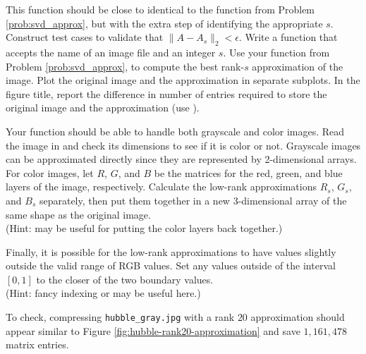 This function should be close to identical to the function from Problem \ref{prob:svd_approx}, but with the extra step of identifying the appropriate $s$.
Construct test cases to validate that $\| A - A_s \|_2 < \epsilon$.
Write a function that accepts the name of an image file and an integer $s$.
Use your function from Problem \ref{prob:svd_approx}, to compute the best rank-$s$ approximation of the image.
Plot the original image and the approximation in separate subplots.
In the figure title, report the difference in number of entries required to store the original image and the approximation (use ).

Your function should be able to handle both grayscale and color images.
Read the image in and check its dimensions to see if it is color or not.
Grayscale images can be approximated directly since they are represented by 2-dimensional arrays.
For color images, let $R$, $G$, and $B$ be the matrices for the red, green, and blue layers of the image, respectively.
Calculate the low-rank approximations $R_s$, $G_s$, and $B_s$ separately, then put them together in a new 3-dimensional array of the same shape as the original image.
\\ (Hint:  may be useful for putting the color layers back together.)

Finally, it is possible for the low-rank approximations to have values slightly outside the valid range of RGB values.
Set any values outside of the interval $[0,1]$ to the closer of the two boundary values.
\\ (Hint: fancy indexing or  may be useful here.)

To check, compressing \texttt{hubble\_gray.jpg} with a rank $20$ approximation should appear similar to Figure \ref{fig:hubble-rank20-approximation} and save $1,161,478$ matrix entries.
